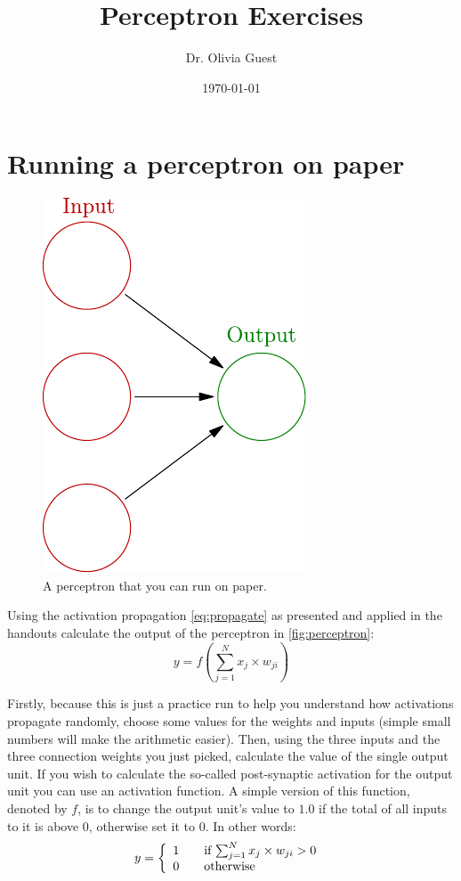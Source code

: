 \documentclass[a4paper,10pt]{article}
\title{Perceptron Exercises}
\author{Dr. Olivia Guest}
\date{\today}
\begin{document}
\maketitle
\section{Running a perceptron on paper}
\begin{figure}[hb]
 \centering
 \includegraphics{../slides/fig/perceptron_empty.pdf}
 \caption{A perceptron that you can run on paper.}
 \label{fig:perceptron}
\end{figure}
Using the activation propagation \autoref{eq:propagate} as presented and applied in the handouts calculate the output of the perceptron in \autoref{fig:perceptron}:
\begin{equation}
\label{eq:propagate}
y = f\left(  \sum_{j=1}^N x_j \times w_{ji} \right)
\end{equation}

Firstly, because this is just a practice run to help you understand how activations propagate randomly, choose some values for the weights and inputs (simple small numbers will make the arithmetic easier). Then, using the three inputs and the three connection weights you just picked, calculate the value of the single output unit. If you wish to calculate the so-called post-synaptic activation for the output unit you can use an activation function. A simple version of this function, denoted by $f$, is to change the output unit's value to $1.0$ if the total of all inputs to it is above $0$, otherwise set it to $0$. In other words:
\begin{equation}
\label{eq:f}
  y = \left\{ 
  \begin{array}{l l}
    1 & \quad \text{if $ \sum_{j=1}^N x_j \times w_{ji} > 0$ }\\
    0 & \quad \text{otherwise}\\
  \end{array} \right.
\end{equation}
\end{document}
